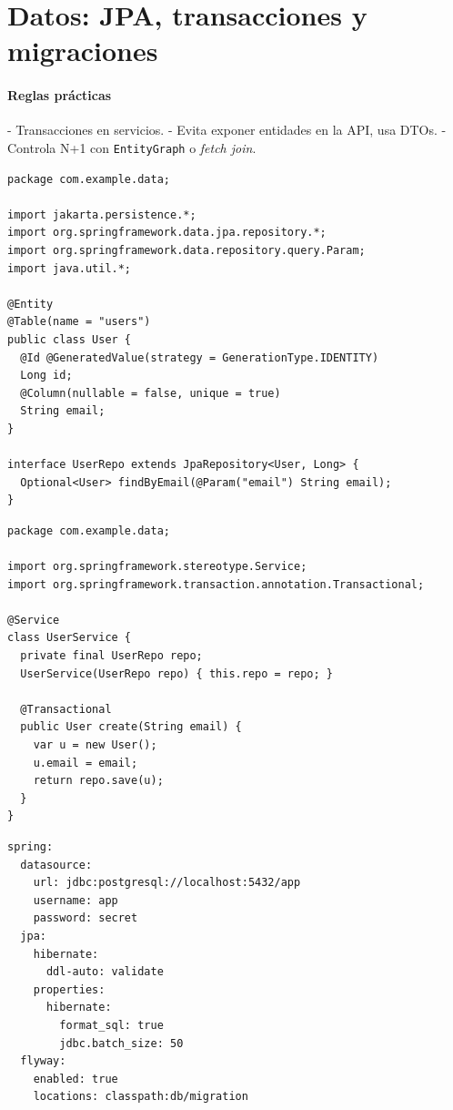 \documentclass[11pt,a4paper]{article}
\begin{document}
\section{Datos: JPA, transacciones y migraciones}
\paragraph{Reglas prácticas}
- Transacciones en servicios. - Evita exponer entidades en la API, usa DTOs. - Controla N+1 con \texttt{EntityGraph} o \emph{fetch join}.

\begin{lstlisting}[style=javastyle, caption={Entidad JPA y repositorio}] 
package com.example.data;

import jakarta.persistence.*;
import org.springframework.data.jpa.repository.*;
import org.springframework.data.repository.query.Param;
import java.util.*;

@Entity
@Table(name = "users")
public class User {
  @Id @GeneratedValue(strategy = GenerationType.IDENTITY)
  Long id;
  @Column(nullable = false, unique = true)
  String email;
}

interface UserRepo extends JpaRepository<User, Long> {
  Optional<User> findByEmail(@Param("email") String email);
}
\end{lstlisting}

\begin{lstlisting}[style=javastyle, caption={Servicio con @Transactional y reglas clave}]
package com.example.data;

import org.springframework.stereotype.Service;
import org.springframework.transaction.annotation.Transactional;

@Service
class UserService {
  private final UserRepo repo;
  UserService(UserRepo repo) { this.repo = repo; }

  @Transactional
  public User create(String email) {
    var u = new User();
    u.email = email;
    return repo.save(u);
  }
}
\end{lstlisting}

\begin{lstlisting}[style=yamlstyle, caption={Configuración JPA y Flyway}]
spring:
  datasource:
    url: jdbc:postgresql://localhost:5432/app
    username: app
    password: secret
  jpa:
    hibernate:
      ddl-auto: validate
    properties:
      hibernate:
        format_sql: true
        jdbc.batch_size: 50
  flyway:
    enabled: true
    locations: classpath:db/migration
\end{lstlisting}
\end{document}
